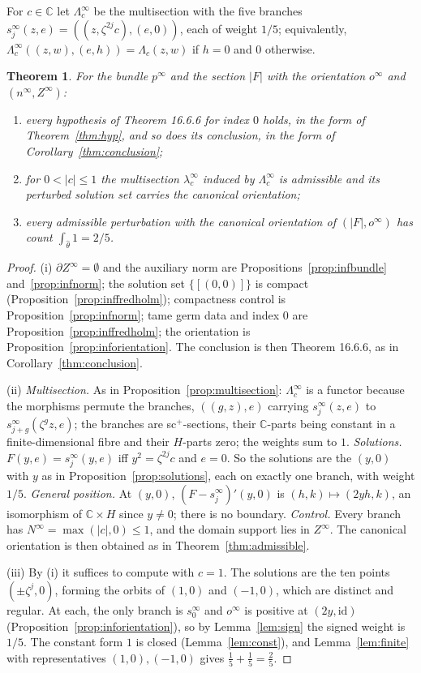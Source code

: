 \documentclass[11pt,a4paper]{article}
\theoremstyle{plain}
\newtheorem{theorem}{Theorem}[section]
\theoremstyle{definition}
\theoremstyle{remark}
\newcommand{\C}{\mathbb{C}}
\newcommand{\abs}[1]{\lvert #1\rvert}
\newcommand{\id}{\mathrm{id}}
\begin{document}
For $c\in\C$ let $\Lambda^\infty_c$ be the multisection with the five branches
$s^\infty_j(z,e)=((z,\zeta^{2j}c),(e,0))$, each of weight $1/5$; equivalently,
$\Lambda^\infty_c((z,w),(e,h))=\Lambda_c(z,w)$ if $h=0$ and $0$ otherwise.

\begin{theorem}\label{thm:inf}
For the bundle $p^\infty$ and the section $\abs F$ with the orientation $o^\infty$ and $(n^\infty,Z^\infty)$:
\begin{enumerate}[label=(\roman*)]
\item every hypothesis of Theorem 16.6.6 for index $0$ holds, in the form of Theorem~\ref{thm:hyp}, and
  so does its conclusion, in the form of Corollary~\ref{thm:conclusion};
\item for $0<\abs c\le1$ the multisection $\lambda^\infty_c$ induced by $\Lambda^\infty_c$ is admissible and
  its perturbed solution set carries the canonical orientation;
\item every admissible perturbation with the canonical orientation of $(\abs F,o^\infty)$ has count
  $\int_{\hat\theta}1=2/5$.
\end{enumerate}
\end{theorem}

\begin{proof}
(i) $\partial Z^\infty=\emptyset$ and the auxiliary norm are Propositions~\ref{prop:infbundle}
and~\ref{prop:infnorm}; the solution set $\{[(0,0)]\}$ is compact (Proposition~\ref{prop:inffredholm});
compactness control is Proposition~\ref{prop:infnorm}; tame germ data and index $0$ are
Proposition~\ref{prop:inffredholm}; the orientation is Proposition~\ref{prop:inforientation}. The
conclusion is then Theorem 16.6.6, as in Corollary~\ref{thm:conclusion}.

(ii) \emph{Multisection.} As in Proposition~\ref{prop:multisection}: $\Lambda^\infty_c$ is a functor
because the morphisms permute the branches, $((g,z),e)$ carrying $s^\infty_j(z,e)$ to
$s^\infty_{j+g}(\zeta^gz,e)$; the branches are sc$^+$-sections, their $\C$-parts being constant in a
finite-dimensional fibre and their $H$-parts zero; the weights sum to $1$.
\emph{Solutions.} $F(y,e)=s^\infty_j(y,e)$ iff $y^2=\zeta^{2j}c$ and $e=0$. So the solutions are the
$(y,0)$ with $y$ as in Proposition~\ref{prop:solutions}, each on exactly one branch, with weight $1/5$.
\emph{General position.} At $(y,0)$, $(F-s^\infty_j)'(y,0)$ is $(h,k)\mapsto(2yh,k)$, an isomorphism of
$\C\times H$ since $y\neq0$; there is no boundary. \emph{Control.} Every branch has
$N^\infty=\max(\abs c,0)\le1$, and the domain support lies in $Z^\infty$. The canonical orientation is
then obtained as in Theorem~\ref{thm:admissible}.

(iii) By (i) it suffices to compute with $c=1$. The solutions are the ten points $(\pm\zeta^j,0)$,
forming the orbits of $(1,0)$ and $(-1,0)$, which are distinct and regular. At each, the only branch is
$s^\infty_0$ and $o^\infty$ is positive at $(2y,\id)$ (Proposition~\ref{prop:inforientation}), so by
Lemma~\ref{lem:sign} the signed weight is $1/5$. The constant form $1$ is closed (Lemma~\ref{lem:const}),
and Lemma~\ref{lem:finite} with representatives $(1,0),(-1,0)$ gives $\frac15+\frac15=\frac25$.
\end{proof}
\end{document}
